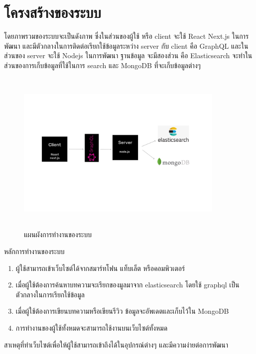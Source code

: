  \section{โครงสร้างของระบบ}
 โดยภาพรวมของระบบจะเป็นดังภาพ ซึ่งในส่วนของผู้ใช้ หรือ client จะใช้ React Next.js ในการพัฒนา และมีตัวกลางในการติดต่อเรียกใช้ข้อมูลระหว่าง server กับ client คือ GraphQL และในส่วนของ server จะใช้ Nodejs ในการพัฒนา ฐานข้อมูล จะมีสองส่วน คือ Elasticsearch จะทำในส่วนของการเก็บข้อมูลที่ใช้ในการ search และ MongoDB ที่จะเก็บข้อมูลต่างๆ
\begin{figure}[h]
\begin{center}
\includegraphics[width=10cm, height=8cm]{database.jpg}
\end{center}
\caption[Application Model]{แผนผังการทำงานของระบบ}
\end{figure}
หลักการทำงานของระบบ
\begin{enumerate}
  \item ผู้ใช้สามารถเข้าเว็บไซต์ได้จากสมาร์ทโฟน แท็บเล็ต หรือคอมพิวเตอร์
  \item เมื่อผู้ใช้ต้องการค้นหาบทความจะเรียกของมูลมาจาก elasticsearch โดยใช้ graphql เป็นตัวกลางในการเรียกใช้ข้อมูล
  \item เมื่อผู้ใช้ต้องการเขียนบทความหรือเขียนรีวิว ข้อมูลจะอัพเดตและเก็บไว้ใน MongoDB 
  \item การทำงานของผู้ใช้ทั้งหมดจะสามารถใช้งานบนเว็บไซต์ทั้งหมด
\end{enumerate}
สาเหตุที่ทำเว็บไซต์เพื่อให้ผู้ใช้สามารถเข้าถึงได้ในอุปกรณ์ต่างๆ และมีความง่ายต่อการพัฒนา
